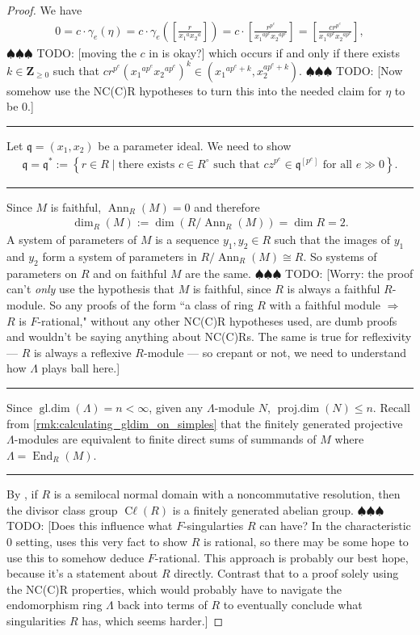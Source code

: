 \documentclass{amsart}
\theoremstyle{definition}
\def\fq{\mathfrak{q}}
\newcommand{\ZZ}{\mathbf Z}
\DeclareMathOperator{\gldim}{\operatorname{gl.dim}}
\DeclareMathOperator{\projdim}{\operatorname{proj.dim}}
\DeclareMathOperator{\End}{\operatorname{End}}
\DeclareMathOperator{\Ann}{\operatorname{Ann}}
\DeclareMathOperator{\Cl}{\operatorname{C\ell}}
\newcommand{\todo}[1]{{\color{teal} \sf $\spadesuit\spadesuit\spadesuit$ TODO: [#1]}}
\begin{document}
\begin{proof}
We have
\begin{align*}
0=c\cdot\gamma_{e}(\eta)=c\cdot\gamma_{e}\left(\left[\frac{r}{{x_{1}}^{a}{x_{2}}^{a}}\right]\right)=c\cdot\left[\frac{r^{p^{e}}}{{x_{1}}^{ap^{e}}{x_{2}}^{ap^{e}}}\right]=\left[\frac{cr^{p^{e}}}{{x_{1}}^{ap^{e}}{x_{2}}^{ap^{e}}}\right],
\end{align*}
\todo{moving the $c$ in is okay?} which occurs if and only if there exists $k\in\ZZ_{\geq0}$ such that $cr^{p^{e}}({x_{1}}^{ap^{e}}{x_{2}}^{ap^{e}})^{k}\in({x_{1}}^{ap^{e}+k},x_{2}^{ap^{e}+k})$. \todo{Now somehow use the NC(C)R hypotheses to turn this into the needed claim for $\eta$ to be $0$.}

\bigbreak\hrule\bigbreak

Let $\fq=(x_{1},x_{2})$ be a parameter ideal. We need to show
\begin{align*}
\fq=\fq^{*}:=\left\{r\in R\mid\text{there exists }c\in R^{\circ}\text{ such that }cz^{p^{e}}\in\fq^{[p^{e}]}\text{ for all }e\gg0\right\}.
\end{align*}

\bigbreak\hrule\bigbreak

Since $M$ is faithful, $\Ann_{R}(M)=0$ and therefore
\begin{align*}
\dim_{R}(M):=\dim(R/\Ann_{R}(M))=\dim R=2.
\end{align*}
A system of parameters of $M$ is a sequence $y_{1},y_{2}\in R$ such that the images of $y_{1}$ and $y_{2}$ form a system of parameters in $R/\Ann_{R}(M)\cong R$. So systems of parameters on $R$ and on faithful $M$ are the same. \todo{Worry: the proof can't \emph{only} use the hypothesis that $M$ is faithful, since $R$ is always a faithful $R$-module. So any proofs of the form ``a class of ring $R$ with a faithful module $\Rightarrow$ $R$ is $F$-rational," without any other NC(C)R hypotheses used, are dumb proofs and wouldn't be saying anything about NC(C)Rs. The same is true for reflexivity --- $R$ is always a reflexive $R$-module --- so crepant or not, we need to understand how $\Lambda$ plays ball here.}

\bigbreak\hrule\bigbreak

Since $\gldim(\Lambda)=n<\infty$, given any $\Lambda$-module $N$, $\projdim(N)\leq n$. Recall from \cref{rmk:calculating_gldim_on_simples} that the finitely generated projective $\Lambda$-modules are equivalent to finite direct sums of summands of $M$ where $\Lambda=\End_{R}(M)$. 

\bigbreak\hrule\bigbreak

By \cite[Cor.\ ~2.1]{DITV15}, if $R$ is a semilocal normal domain with a noncommutative resolution, then the divisor class group $\Cl(R)$ is a finitely generated abelian group. \todo{Does this influence what $F$-singularties $R$ can have? In the characteristic $0$ setting, \cite[Cor.\ ~3.3]{DITV15} uses this very fact to show $R$ is rational, so there may be some hope to use this to somehow deduce $F$-rational. This approach is probably our best hope, because it's a statement about $R$ directly. Contrast that to a proof solely using the NC(C)R properties, which would probably have to navigate the endomorphism ring $\Lambda$ back into terms of $R$ to eventually conclude what singularities $R$ has, which seems harder.}


\end{proof}
\end{document}
